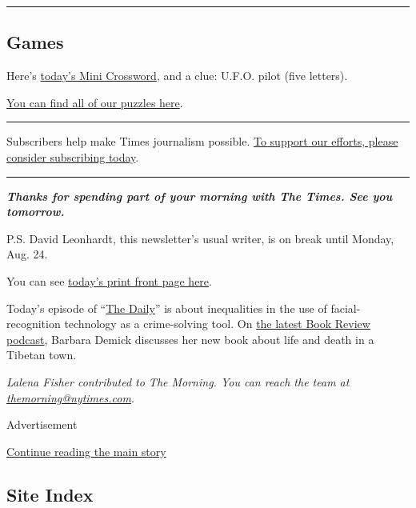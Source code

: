 \begin{center}\rule{0.5\linewidth}{\linethickness}\end{center}

\hypertarget{games}{%
\subsection{Games}\label{games}}

Here's \href{https://www.nytimes.com/crosswords/game/mini}{today's Mini
Crossword}, and a clue: U.F.O. pilot (five letters).

\href{https://www.nytimes.com/crosswords}{You can find all of our
puzzles here}.

\begin{center}\rule{0.5\linewidth}{\linethickness}\end{center}

Subscribers help make Times journalism possible.
\href{https://www.nytimes.com/subscription?campaignId=98XRW}{To support
our efforts, please consider subscribing today}.

\begin{center}\rule{0.5\linewidth}{\linethickness}\end{center}

\emph{\textbf{Thanks for spending part of your morning with The Times.
See you tomorrow.}}

P.S. David Leonhardt, this newsletter's usual writer, is on break until
Monday, Aug. 24.

You can see
\href{https://static01.nyt.com/images/2020/08/03/nytfrontpage/scan.pdf}{today's
print front page here}.

Today's episode of ``\href{https://www.nytimes.com/thedaily}{The
Daily}'' is about inequalities in the use of facial-recognition
technology as a crime-solving tool. On
\href{https://www.nytimes.com/2020/07/31/books/review/podcast-twilight-democracy-anne-applebaum-eat-buddha-barbara-demick.html}{the
latest Book Review podcast}, Barbara Demick discusses her new book about
life and death in a Tibetan town.

\emph{Lalena Fisher contributed to The Morning. You can reach the team
at}
\href{mailto:themorning@nytimes.com}{\emph{themorning@nytimes.com}}\emph{.}

Advertisement

\protect\hyperlink{after-bottom}{Continue reading the main story}

\hypertarget{site-index}{%
\subsection{Site Index}\label{site-index}}


